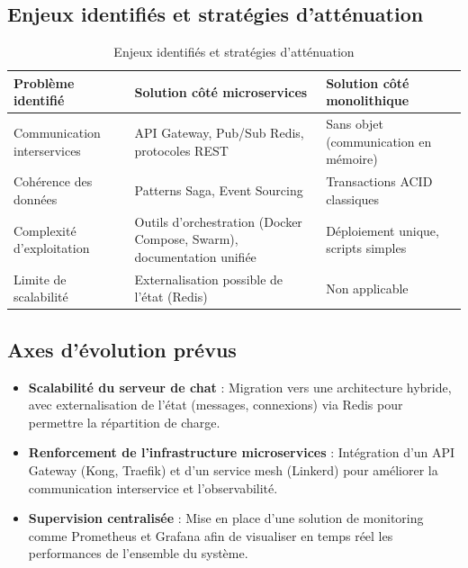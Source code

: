 \documentclass{rapportPfe}
\begin{document}
\subsection{Enjeux identifiés et stratégies d’atténuation}

\begin{table}[H]
\centering
\begin{tabular}{|p{4.5cm}|p{5cm}|p{5cm}|}
\hline
\textbf{Problème identifié} & \textbf{Solution côté microservices} & \textbf{Solution côté monolithique} \\
\hline
Communication interservices & API Gateway, Pub/Sub Redis, protocoles REST & Sans objet (communication en mémoire) \\
\hline
Cohérence des données & Patterns Saga, Event Sourcing & Transactions ACID classiques \\
\hline
Complexité d’exploitation & Outils d’orchestration (Docker Compose, Swarm), documentation unifiée & Déploiement unique, scripts simples \\
\hline
Limite de scalabilité & Externalisation possible de l’état (Redis) & Non applicable \\
\hline
\end{tabular}
\caption{Enjeux identifiés et stratégies d’atténuation}
\label{tab:prob_solut}
\end{table}

\subsection{Axes d’évolution prévus}

\begin{itemize}
    \item \textbf{Scalabilité du serveur de chat} : Migration vers une architecture hybride, avec externalisation de l’état (messages, connexions) via Redis pour permettre la répartition de charge.
    
    \item \textbf{Renforcement de l'infrastructure microservices} : Intégration d’un API Gateway (Kong, Traefik) et d’un service mesh (Linkerd) pour améliorer la communication interservice et l'observabilité.
    
    \item \textbf{Supervision centralisée} : Mise en place d’une solution de monitoring comme Prometheus et Grafana afin de visualiser en temps réel les performances de l’ensemble du système.
\end{itemize}
\end{document}
